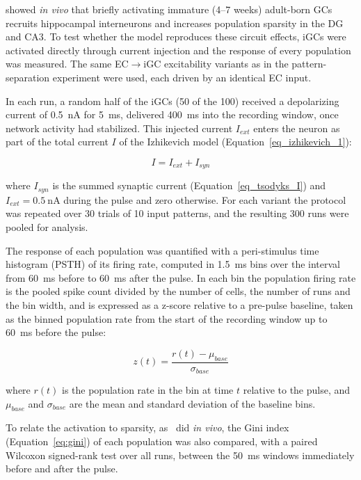 \textcite{mchughAdultborn2022} showed \textit{in vivo} that briefly activating immature (4--7 weeks) adult-born GCs recruits
hippocampal interneurons and increases population sparsity in the DG and CA3. To test whether the model reproduces these circuit
effects, iGCs were activated directly through current injection and the response of every population was measured. The same
EC$\to$iGC excitability variants as in the pattern-separation experiment were used, each driven by an identical EC input.

In each run, a random half of the iGCs (50 of the 100) received a depolarizing current of \SI{0.5}{\nano\ampere} for
\SI{5}{\milli\second}, delivered \SI{400}{\milli\second} into the recording window, once network activity had stabilized. This
injected current $I_{ext}$ enters the neuron as part of the total current $I$ of the Izhikevich model
(Equation~\ref{eq_izhikevich_1}):

\begin{equation}
    \label{eq:i_ext}
    I = I_{ext} + I_{syn}
\end{equation}

where $I_{syn}$ is the summed synaptic current (Equation~\ref{eq_tsodyks_I}) and $I_{ext} = \SI{0.5}{\nano\ampere}$ during the
pulse and zero otherwise. For each variant the protocol was repeated over 30 trials of 10 input patterns, and the resulting 300
runs were pooled for analysis.

The response of each population was quantified with a peri-stimulus time histogram (PSTH) of its firing rate, computed in
\SI{1.5}{\milli\second} bins over the interval from \SI{60}{\milli\second} before to \SI{60}{\milli\second} after the pulse. In
each bin the population firing rate is the pooled spike count divided by the number of cells, the number of runs and the bin
width, and is expressed as a z-score relative to a pre-pulse baseline, taken as the binned population rate from the start of the
recording window up to \SI{60}{\milli\second} before the pulse:

\begin{equation}
    \label{eq:psth_z}
    z(t) = \frac{r(t) - \mu_{base}}{\sigma_{base}}
\end{equation}

where $r(t)$ is the population rate in the bin at time $t$ relative to the pulse, and $\mu_{base}$ and $\sigma_{base}$ are the
mean and standard deviation of the baseline bins.

To relate the activation to sparsity, as~\textcite{mchughAdultborn2022} did \textit{in vivo}, the Gini index
(Equation~\ref{eq:gini}) of each population was also compared, with a paired Wilcoxon signed-rank test over all runs, between the
\SI{50}{\milli\second} windows immediately before and after the pulse.

